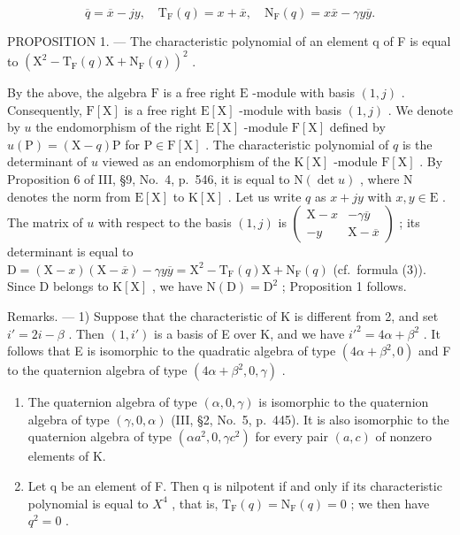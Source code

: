 \[
\overline {{q}} = \overline {{x}} - j y, \quad \mathrm{T} _ {\mathrm{F}} (q) = x + \overline {{x}}, \quad \mathrm{N} _ {\mathrm{F}} (q) = x \overline {{x}} - \gamma y \overline {{y}}.\tag{3}
\]

PROPOSITION 1. --- The characteristic polynomial of an element q of F is equal to \(\left(\mathrm{X}^{2}-\mathrm{T}_{\mathrm{F}}(q)\mathrm{X}+\mathrm{N}_{\mathrm{F}}(q)\right)^{2}\) .

By the above, the algebra \(\mathrm{F}\) is a free right \(\mathrm{E}\) -module with basis \((1,j)\) . Consequently, \(\mathrm{F}[\mathrm{X}]\) is a free right \(\mathrm{E}[\mathrm{X}]\) -module with basis \((1,j)\) . We denote by \(u\) the endomorphism of the right \(\mathrm{E}[\mathrm{X}]\) -module \(\mathrm{F}[\mathrm{X}]\) defined by \(u(\mathrm{P}) = (\mathrm{X} - q)\mathrm{P}\) for \(\mathrm{P} \in \mathrm{F}[\mathrm{X}]\) . The characteristic polynomial of \(q\) is the determinant of \(u\) viewed as an endomorphism of the \(\mathrm{K}[\mathrm{X}]\) -module \(\mathrm{F}[\mathrm{X}]\) . By Proposition 6 of III, §9, No.~4, p.~546, it is equal to \(\mathrm{N}(\det u)\) , where \(\mathrm{N}\) denotes the norm from \(\mathrm{E}[\mathrm{X}]\) to \(\mathrm{K}[\mathrm{X}]\) . Let us write \(q\) as \(x + jy\) with \(x, y \in \mathrm{E}\) . The matrix of \(u\) with respect to the basis \((1,j)\) is \(\begin{pmatrix} \mathrm{X} - x & -\gamma \overline{y} \\ -y & \mathrm{X} - \overline{x} \end{pmatrix}\) ; its determinant is equal to \(\mathrm{D} = (\mathrm{X} - x)(\mathrm{X} - \overline{x}) - \gamma y\overline{y} = \mathrm{X}^2 - \mathrm{T}_{\mathrm{F}}(q)\mathrm{X} + \mathrm{N}_{\mathrm{F}}(q)\) (cf.~formula (3)). Since \(\mathrm{D}\) belongs to \(\mathrm{K}[\mathrm{X}]\) , we have \(\mathrm{N}(\mathrm{D}) = \mathrm{D}^2\) ; Proposition 1 follows.

Remarks. --- 1) Suppose that the characteristic of K is different from 2, and set \(i' = 2i - \beta\) . Then \((1, i')\) is a basis of E over K, and we have \(i'^2 = 4\alpha + \beta^2\) . It follows that E is isomorphic to the quadratic algebra of type \((4\alpha + \beta^2, 0)\) and F to the quaternion algebra of type \((4\alpha + \beta^2, 0, \gamma)\) .

\begin{enumerate}
\def\labelenumi{\arabic{enumi})}
\setcounter{enumi}{1}
\item
  The quaternion algebra of type \((\alpha,0,\gamma)\) is isomorphic to the quaternion algebra of type \((\gamma,0,\alpha)\) (III, §2, No.~5, p.~445). It is also isomorphic to the quaternion algebra of type \((\alpha a^{2},0,\gamma c^{2})\) for every pair \((a,c)\) of nonzero elements of K.
\item
  Let q be an element of F. Then q is nilpotent if and only if its characteristic polynomial is equal to \(X^{4}\) , that is, \(\mathrm{T}_{\mathrm{F}}(q)=\mathrm{N}_{\mathrm{F}}(q)=0\) ; we then have \(q^{2}=0\) .
\end{enumerate}

